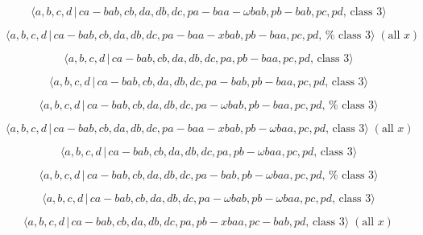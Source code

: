 \documentclass[10pt]{article}
\begin{document}
\begin{equation}
\langle a,b,c,d\,|\,ca-bab,cb,da,db,dc,pa-baa-\omega bab,pb-bab,pc,pd,\,%
\text{class }3\rangle  \tag{7.3307}
\end{equation}

\begin{equation}
\langle a,b,c,d\,|\,ca-bab,cb,da,db,dc,pa-baa-xbab,pb-baa,pc,pd,\,\text{%
class }3\rangle \;(\text{all }x)  \tag{7.3308}
\end{equation}

\begin{equation}
\langle a,b,c,d\,|\,ca-bab,cb,da,db,dc,pa,pb-baa,pc,pd,\,\text{class }%
3\rangle  \tag{7.3309}
\end{equation}

\begin{equation}
\langle a,b,c,d\,|\,ca-bab,cb,da,db,dc,pa-bab,pb-baa,pc,pd,\,\text{class }%
3\rangle  \tag{7.3310}
\end{equation}

\begin{equation}
\langle a,b,c,d\,|\,ca-bab,cb,da,db,dc,pa-\omega bab,pb-baa,pc,pd,\,\text{%
class }3\rangle  \tag{7.3311}
\end{equation}

\begin{equation}
\langle a,b,c,d\,|\,ca-bab,cb,da,db,dc,pa-baa-xbab,pb-\omega baa,pc,pd,\,%
\text{class }3\rangle \;(\text{all }x)  \tag{7.3312}
\end{equation}

\begin{equation}
\langle a,b,c,d\,|\,ca-bab,cb,da,db,dc,pa,pb-\omega baa,pc,pd,\,\text{class }%
3\rangle  \tag{7.3313}
\end{equation}

\begin{equation}
\langle a,b,c,d\,|\,ca-bab,cb,da,db,dc,pa-bab,pb-\omega baa,pc,pd,\,\text{%
class }3\rangle  \tag{7.3314}
\end{equation}

\begin{equation}
\langle a,b,c,d\,|\,ca-bab,cb,da,db,dc,pa-\omega bab,pb-\omega baa,pc,pd,\,%
\text{class }3\rangle  \tag{7.3315}
\end{equation}

\begin{equation}
\langle a,b,c,d\,|\,ca-bab,cb,da,db,dc,pa,pb-xbaa,pc-bab,pd,\,\text{class }%
3\rangle \;(\text{all }x)  \tag{7.3316}
\end{equation}
\end{document}
